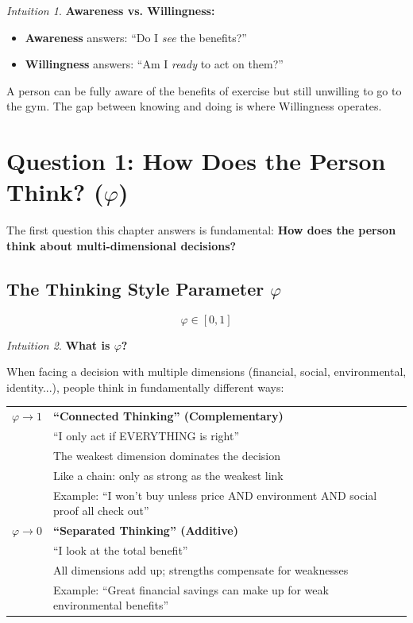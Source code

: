 \documentclass[11pt,a4paper]{book}
\theoremstyle{definition}
\theoremstyle{remark}
\newtheorem*{intuition}{Intuition}
\begin{document}
\begin{intuition}
\textbf{Awareness vs. Willingness:}
\begin{itemize}
\item \textbf{Awareness} answers: ``Do I \textit{see} the benefits?''
\item \textbf{Willingness} answers: ``Am I \textit{ready} to act on them?''
\end{itemize}
A person can be fully aware of the benefits of exercise but still unwilling to go to the gym. The gap between knowing and doing is where Willingness operates.
\end{intuition}

\section{Question 1: How Does the Person Think? ($\varphi$)}
\label{sec:12-phi}

The first question this chapter answers is fundamental: \textbf{How does the person think about multi-dimensional decisions?}

\subsection{The Thinking Style Parameter $\varphi$}

\begin{equation}
\boxed{\varphi \in [0, 1]}
\end{equation}

\begin{intuition}
\textbf{What is $\varphi$?}

When facing a decision with multiple dimensions (financial, social, environmental, identity...), people think in fundamentally different ways:

\begin{center}
\begin{tabular}{cp{10cm}}
\toprule
$\varphi \to 1$ & \textbf{``Connected Thinking'' (Complementary)}\\
& ``I only act if EVERYTHING is right''\\
& The weakest dimension dominates the decision\\
& Like a chain: only as strong as the weakest link\\
& Example: ``I won't buy unless price AND environment AND social proof all check out''\\[8pt]

$\varphi \to 0$ & \textbf{``Separated Thinking'' (Additive)}\\
& ``I look at the total benefit''\\
& All dimensions add up; strengths compensate for weaknesses\\
& Example: ``Great financial savings can make up for weak environmental benefits''\\
\bottomrule
\end{tabular}
\end{center}
\end{intuition}
\end{document}
